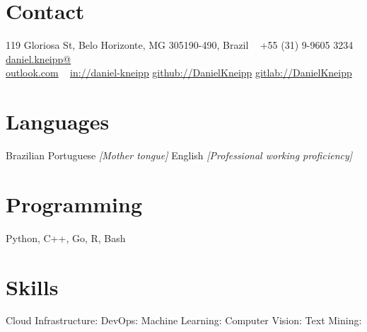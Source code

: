 \documentclass[a4paper]{cv-friggeri-x}
\begin{document}


\begin{aside} %
\section{Contact}
\pin \hfill 119 Gloriosa St,
Belo Horizonte, MG 
305190-490, Brazil
~
{\Large\textcolor{gray}{\Mobilefone}} \hfill +55 (31) 9-9605 3234
{\Large\textcolor{gray}{\Letter}} \hfill \href{mailto:daniel.kneipp@outlook.com}{daniel.kneipp@\\outlook.com}
~
\llogo \hfill \href{https://www.linkedin.com/in/daniel-kneipp/}{in://daniel-kneipp}
\githublogo \hfill \href{https://github.com/DanielKneipp}{github://DanielKneipp}
\gitlablogo \hfill \href{https://gitlab.com/DanielKneipp}{gitlab://DanielKneipp}
\section{Languages}
Brazilian Portuguese \hspace{5mm}\null
\textit{\footnotesize{[Mother tongue]}}
English  \hspace{5mm}\null
\textit{\footnotesize{[Professional working proficiency]}}
\section{Programming}
Python, C++, Go,
R, Bash
\section{Skills}
Cloud Infrastructure: \hspace{5mm}\null
{}
DevOps:               \hspace{5mm}\null
{} 
Machine Learning:     \hspace{5mm}\null
{} 
Computer Vision:      \hspace{5mm}\null
{}
Text Mining:          \hspace{5mm}\null
{}
\end{aside}
\end{document}
